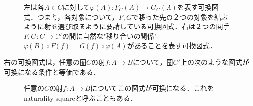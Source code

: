 \documentclass[uplatex, dvipdfmx]{jsreport}
\begin{document}
\begin{figure}[h]\begin{center}
    \caption{左は各$A\in C$に対して$\varphi (A):F_C(A)\rightarrow G_C(A)$を表す可換図式．つまり，各対象について，$F,G$で移った先の２つの対象を結ぶように射を選び取るように要請している可換図式．右は２つの関手$F,G:C\to C'$の間に自然な"移り合いの関係"$\varphi (B)\circ F(f)=G(f)\circ\varphi (A)$があることを表す可換図式．\label{def-cd:13}}
\end{center}\end{figure}
\begin{remark}
    右の可換図式は，任意の圏$C$の射$f:A\to B$について，圏$C'$上の次のような図式が可換になる条件と等価である．
    \begin{figure}[h]\begin{center}\caption{任意の$C$の射$f:A\to B$についてこの図式が可換になる．これをnaturality squareと呼ぶこともある．\label{def-cd:15'}}\end{center}\end{figure}
\end{remark}
\end{document}
